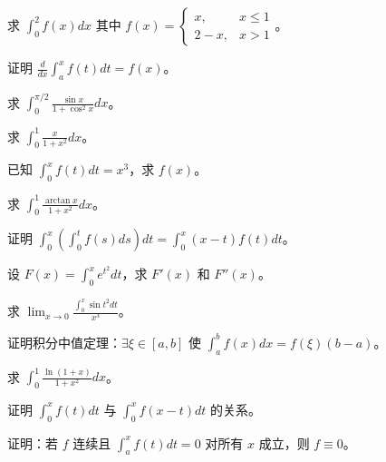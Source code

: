 \begin{exercise}[4] 求 \(\int_0^2 f(x)dx\) 其中 \(f(x)=\begin{cases}x,&x\le1\\2-x,&x>1\end{cases}\)。\end{exercise}
\begin{exercise}[4] 证明 \(\frac{d}{dx}\int_a^x f(t)dt = f(x)\)。\end{exercise}
\begin{exercise}[4] 求 \(\int_0^{\pi/2} \frac{\sin x}{1+\cos^2 x} dx\)。\end{exercise}
\begin{exercise}[4] 求 \(\int_0^1 \frac{x}{1+x^2} dx\)。\end{exercise}
\begin{exercise}[4] 已知 \(\int_0^x f(t)dt = x^3\)，求 \(f(x)\)。\end{exercise}
\begin{exercise}[5] 求 \(\int_0^1 \frac{\arctan x}{1+x^2} dx\)。\end{exercise}
\begin{exercise}[5] 证明 \(\int_0^x (\int_0^t f(s)ds)dt = \int_0^x (x-t)f(t)dt\)。\end{exercise}
\begin{exercise}[5] 设 \(F(x)=\int_0^x e^{t^2}dt\)，求 \(F'(x)\) 和 \(F''(x)\)。\end{exercise}
\begin{exercise}[5] 求 \(\lim_{x\to0}\frac{\int_0^x \sin t^2 dt}{x^3}\)。\end{exercise}
\begin{exercise}[6] 证明积分中值定理：\(\exists\xi\in[a,b]\) 使 \(\int_a^b f(x)dx = f(\xi)(b-a)\)。\end{exercise}
\begin{exercise}[6] 求 \(\int_0^1 \frac{\ln(1+x)}{1+x^2} dx\)。\end{exercise}
\begin{exercise}[6] 证明 \(\int_0^x f(t)dt\) 与 \(\int_0^x f(x-t)dt\) 的关系。\end{exercise}
\begin{exercise}[7] 证明：若 \(f\) 连续且 \(\int_a^x f(t)dt=0\) 对所有 \(x\) 成立，则 \(f\equiv0\)。\end{exercise}
